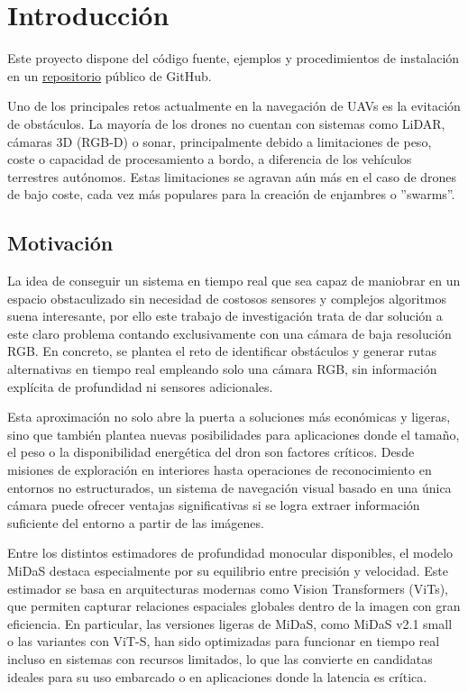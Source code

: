   \chapter{Introducción}
Este proyecto dispone del código fuente, ejemplos y procedimientos de instalación en un \href{https://github.com/andrelorenzo/Vision2D_navigation}{repositorio} público de GitHub.

Uno de los principales retos actualmente en la navegación de UAVs es la evitación de obstáculos. La mayoría de los drones no cuentan con sistemas como LiDAR, cámaras 3D (RGB-D) o sonar, principalmente debido a limitaciones de peso, coste o capacidad de procesamiento a bordo, a diferencia de los vehículos terrestres autónomos. Estas limitaciones se agravan aún más en el caso de drones de bajo coste, cada vez más populares para la creación de enjambres o ''swarms''.

    \section{Motivación}
La idea de conseguir un sistema en tiempo real que sea capaz de maniobrar en un espacio obstaculizado sin necesidad de costosos sensores y complejos algoritmos suena interesante, por ello este trabajo de investigación trata de dar solución a este claro problema contando exclusivamente con una cámara de baja resolución RGB. En concreto, se plantea el reto de identificar obstáculos y generar rutas alternativas en tiempo real empleando solo una cámara RGB, sin información explícita de profundidad ni sensores adicionales.

Esta aproximación no solo abre la puerta a soluciones más económicas y ligeras, sino que también plantea nuevas posibilidades para aplicaciones donde el tamaño, el peso o la disponibilidad energética del dron son factores críticos. Desde misiones de exploración en interiores hasta operaciones de reconocimiento en entornos no estructurados, un sistema de navegación visual basado en una única cámara puede ofrecer ventajas significativas si se logra extraer información suficiente del entorno a partir de las imágenes.

Entre los distintos estimadores de profundidad monocular disponibles, el modelo MiDaS destaca especialmente por su equilibrio entre precisión y velocidad. Este estimador se basa en arquitecturas modernas como Vision Transformers (ViTs), que permiten capturar relaciones espaciales globales dentro de la imagen con gran eficiencia. En particular, las versiones ligeras de MiDaS, como MiDaS v2.1 small o las variantes con ViT-S, han sido optimizadas para funcionar en tiempo real incluso en sistemas con recursos limitados, lo que las convierte en candidatas ideales para su uso embarcado o en aplicaciones donde la latencia es crítica.

